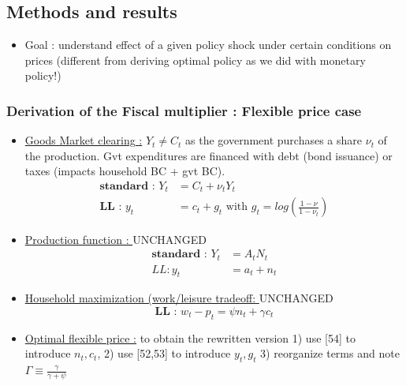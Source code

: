 \documentclass{article}
\begin{document}
\subsection{Methods and results}
\begin{itemize}
     \item Goal : understand effect of a given policy shock under certain conditions on prices (different from deriving optimal policy as we did with monetary policy!)
\end{itemize}

\subsubsection{Derivation of the Fiscal multiplier : 
Flexible price case}
\begin{itemize}
    \item \underline{Goods Market clearing :} $Y_t \neq C_t$ as the government purchases a share $\nu_t$ of the production. Gvt expenditures are financed with debt (bond issuance) or taxes (impacts household BC + gvt BC). 
    \begin{equation}
    \begin{aligned}
        \textbf{standard : }Y_t &=C_t + \nu_tY_t\\
        \textbf{LL : }y_t &= c_t + g_t \text{ with $g_t = log(\frac{1-\nu}{1-\nu_t})$}
    \end{aligned}
    \end{equation}
    \item \underline{Production function : }UNCHANGED
    \begin{equation}
    \begin{aligned}
        \textbf{standard : } Y_t&=A_tN_t\\
        LL : y_t &= a_t + n_t
    \end{aligned}
    \end{equation}
    \item \underline{Household maximization (work/leisure tradeoff: }UNCHANGED
    \begin{equation}
        \textbf{LL : }w_t - p_t = \psi n_t + \gamma c_t
    \end{equation}
    \item \underline{Optimal flexible price :} to obtain the rewritten version 1) use [54] to introduce $n_t, c_t$, 2) use [52,53] to introduce $y_t, g_t$ 3) reorganize terms and note $\Gamma \equiv \frac{\gamma}{\gamma+\psi}$
    \begin{equation}
    \begin{aligned}

\end{aligned}
\end{equation}
\end{itemize}
\end{document}
